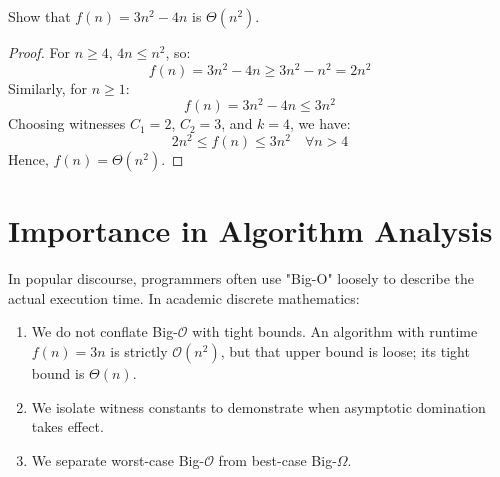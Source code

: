 \begin{example}
Show that $f(n) = 3n^2 - 4n$ is $\Theta(n^2)$.
\begin{proof}
For $n \ge 4$, $4n \le n^2$, so:
$$f(n) = 3n^2 - 4n \ge 3n^2 - n^2 = 2n^2$$
Similarly, for $n \ge 1$:
$$f(n) = 3n^2 - 4n \le 3n^2$$
Choosing witnesses $C_1 = 2$, $C_2 = 3$, and $k = 4$, we have:
$$2n^2 \le f(n) \le 3n^2 \quad \forall n > 4$$
Hence, $f(n) = \Theta(n^2)$.
\end{proof}
\end{example}

\section{Importance in Algorithm Analysis}
In popular discourse, programmers often use "Big-O" loosely to describe the actual execution time. In academic discrete mathematics:
\begin{enumerate}
    \item We do not conflate Big-$\mathcal{O}$ with tight bounds. An algorithm with runtime $f(n) = 3n$ is strictly $\mathcal{O}(n^2)$, but that upper bound is loose; its tight bound is $\Theta(n)$.
    \item We isolate witness constants to demonstrate when asymptotic domination takes effect.
    \item We separate worst-case Big-$\mathcal{O}$ from best-case Big-$\Omega$.
\end{enumerate}
